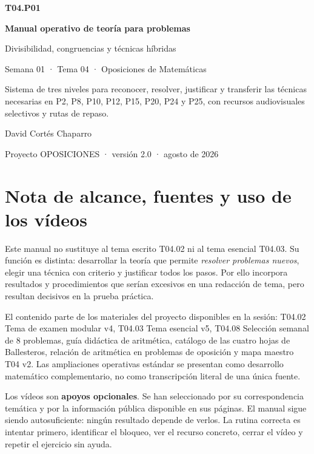 \documentclass[11pt,a4paper,openany]{book}
\begin{document}
\frontmatter
\begin{titlepage}
\centering
\vspace*{1.1cm}
{\Huge\bfseries\color{navy}T04.P01\par}
\vspace{0.35cm}
{\LARGE\bfseries Manual operativo de teoría para problemas\par}
\vspace{0.2cm}
{\Large Divisibilidad, congruencias y técnicas híbridas\par}
\vspace{0.7cm}
{\large Semana 01 · Tema 04 · Oposiciones de Matemáticas\par}
\vfill
\begin{tcolorbox}[colback=lightblue,colframe=navy,width=.88\textwidth,arc=2mm,boxrule=.7pt]
\centering
Sistema de tres niveles para reconocer, resolver, justificar y transferir las técnicas necesarias en P2, P8, P10, P12, P15, P20, P24 y P25, con recursos audiovisuales selectivos y rutas de repaso.
\end{tcolorbox}
\vfill
{\large David Cortés Chaparro\par}
{\small Proyecto OPOSICIONES · versión 2.0 · agosto de 2026\par}
\end{titlepage}

\chapter*{Nota de alcance, fuentes y uso de los vídeos}
Este manual no sustituye al tema escrito T04.02 ni al tema esencial T04.03. Su función es distinta: desarrollar la teoría que permite \emph{resolver problemas nuevos}, elegir una técnica con criterio y justificar todos los pasos. Por ello incorpora resultados y procedimientos que serían excesivos en una redacción de tema, pero resultan decisivos en la prueba práctica.

El contenido parte de los materiales del proyecto disponibles en la sesión: T04.02 Tema de examen modular v4, T04.03 Tema esencial v5, T04.08 Selección semanal de 8 problemas, guía didáctica de aritmética, catálogo de las cuatro hojas de Ballesteros, relación de aritmética en problemas de oposición y mapa maestro T04 v2. Las ampliaciones operativas estándar se presentan como desarrollo matemático complementario, no como transcripción literal de una única fuente.

Los vídeos son \textbf{apoyos opcionales}. Se han seleccionado por su correspondencia temática y por la información pública disponible en sus páginas. El manual sigue siendo autosuficiente: ningún resultado depende de verlos. La rutina correcta es intentar primero, identificar el bloqueo, ver el recurso concreto, cerrar el vídeo y repetir el ejercicio sin ayuda.
\end{document}
